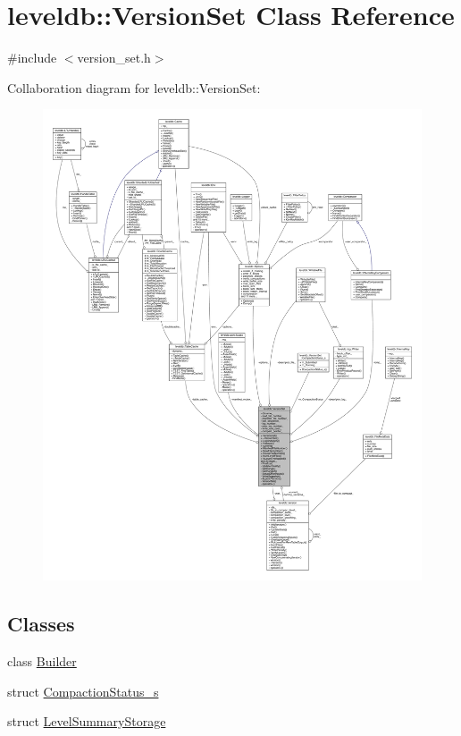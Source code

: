 \hypertarget{classleveldb_1_1_version_set}{}\section{leveldb\+:\+:Version\+Set Class Reference}
\label{classleveldb_1_1_version_set}


{\ttfamily \#include $<$version\+\_\+set.\+h$>$}



Collaboration diagram for leveldb\+:\+:Version\+Set\+:
\nopagebreak
\begin{figure}[H]
\begin{center}
\leavevmode
\includegraphics[width=350pt]{classleveldb_1_1_version_set__coll__graph}
\end{center}
\end{figure}
\subsection*{Classes}
\begin{DoxyCompactItemize}
\item 
class \hyperlink{classleveldb_1_1_version_set_1_1_builder}{Builder}
\item 
struct \hyperlink{structleveldb_1_1_version_set_1_1_compaction_status__s}{Compaction\+Status\+\_\+s}
\item 
struct \hyperlink{structleveldb_1_1_version_set_1_1_level_summary_storage}{Level\+Summary\+Storage}
\end{DoxyCompactItemize}
